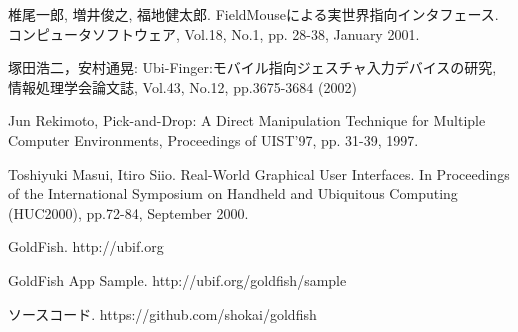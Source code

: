 \begin{thebibliography}{10}

椎尾一郎, 増井俊之, 福地健太郎. FieldMouseによる実世界指向インタフェース. コンピュータソフトウェア, Vol.18, No.1, pp. 28-38, January 2001.

塚田浩二，安村通晃: Ubi-Finger:モバイル指向ジェスチャ入力デバイスの研究, 情報処理学会論文誌, Vol.43, No.12, pp.3675-3684 (2002)

Jun Rekimoto, Pick-and-Drop: A Direct Manipulation Technique for Multiple Computer Environments, Proceedings of UIST'97, pp. 31-39, 1997.

Toshiyuki Masui, Itiro Siio. Real-World Graphical User Interfaces. In Proceedings of the International Symposium on Handheld and Ubiquitous Computing (HUC2000), pp.72-84, September 2000. 

GoldFish. http://ubif.org

GoldFish App Sample. http://ubif.org/goldfish/sample

ソースコード. https://github.com/shokai/goldfish

\end{thebibliography}

